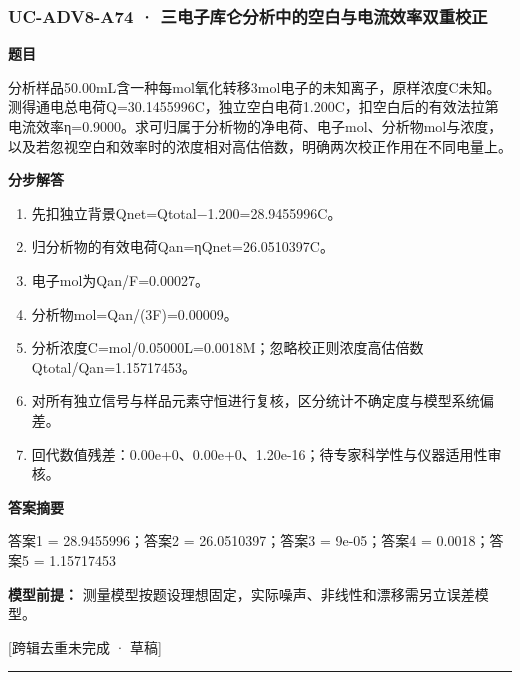 \documentclass[UTF8,11pt,a4paper]{ctexart}
\begin{document}
\subsubsection*{UC-ADV8-A74 · 三电子库仑分析中的空白与电流效率双重校正}
\noindent\textbf{题目}\par
分析样品50.00mL含一种每mol氧化转移3mol电子的未知离子，原样浓度C未知。测得通电总电荷Q=30.1455996C，独立空白电荷1.200C，扣空白后的有效法拉第电流效率η=0.9000。求可归属于分析物的净电荷、电子mol、分析物mol与浓度，以及若忽视空白和效率时的浓度相对高估倍数，明确两次校正作用在不同电量上。\par
\medskip\noindent\textbf{分步解答}
\begin{enumerate}
\item 先扣独立背景Qnet=Qtotal−1.200=28.9455996C。
\item 归分析物的有效电荷Qan=ηQnet=26.0510397C。
\item 电子mol为Qan/F=0.00027。
\item 分析物mol=Qan/(3F)=0.00009。
\item 分析浓度C=mol/0.05000L=0.0018M；忽略校正则浓度高估倍数Qtotal/Qan=1.15717453。
\item 对所有独立信号与样品元素守恒进行复核，区分统计不确定度与模型系统偏差。
\item 回代数值残差：0.00e+0、0.00e+0、1.20e-16；待专家科学性与仪器适用性审核。
\end{enumerate}
\noindent\textbf{答案摘要}\par
答案1 = 28.9455996；答案2 = 26.0510397；答案3 = 9e-05；答案4 = 0.0018；答案5 = 1.15717453\par
\noindent\textbf{模型前提：}
测量模型按题设理想固定，实际噪声、非线性和漂移需另立误差模型。\par
\noindent\textcolor{red!65!black}{[跨辑去重未完成 · 草稿]} \par
\medskip\hrule\medskip
{}
\end{document}
